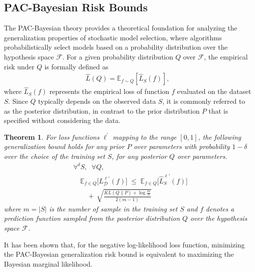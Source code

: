 \documentclass[letterpaper]{article} %
\newtheorem{theorem}{Theorem}
\begin{document}
\subsection{PAC-Bayesian Risk Bounds}


The PAC-Bayesian theory provides a theoretical foundation for analyzing the generalization properties of stochastic model selection, where algorithms probabilistically select models based on a probability distribution over the hypothesis space \(\mathcal{F}\). For a given probability distribution \(Q\) over \(\mathcal{F}\), the empirical risk under \(Q\) is formally defined as 
\begin{align}
    \widehat{L}(Q) = \mathbb{E}_{f \sim Q}[\hat{L}_S(f)], 
\end{align}
where \(\hat{L}_S(f)\) represents the empirical loss of function \(f\) evaluated on the dataset \(S\). Since \(Q\) typically depends on the observed data \(S\), it is commonly referred to as the posterior distribution, in contrast to the prior distribution \(P\) that is specified without considering the data. 
\begin{theorem} \label{theorem: PAC2003}
\citep{mcallesterPACBayesianStochasticModel2003}
For loss functions $\ell^{'}$ mapping to the range $[0,1]$, the following generalization bound holds for any prior $P$ over parameters with probability $1 - \delta$ over the choice of the training set $S$, for any posterior $Q$ over parameters.
\begin{equation}\label{eq:PAC2003}
\begin{aligned}
    &\forall^{\delta} S,\;\; \forall Q, \\
    &\quad
    \mathbb{E}_{f \in Q}\big[L_{\mathcal{D}}^{\ell'}(f)\big] \;\leq\;
    \mathbb{E}_{f \in Q}\big[\widehat{L}^{\ell'}_{S}(f)\big] \\
    &\qquad
    +\, \sqrt{
        \frac{
            KL(Q\|P) + \log\frac{m}{\delta}
        }{
            2(m-1)
        }
    }
\end{aligned}
\end{equation}
where $m=|S|$ is the number of sample in the training set $S$ and $f$ denotes a prediction function sampled from the posterior distribution $Q$ over the hypothesis space $\mathcal{F}$.
\end{theorem}
It has been shown that, for the negative log-likelihood loss function, minimizing the PAC-Bayesian generalization risk bound is equivalent to maximizing the Bayesian marginal likelihood\cite{germainPACBayesianTheoryMeets2016}.
\end{document}
